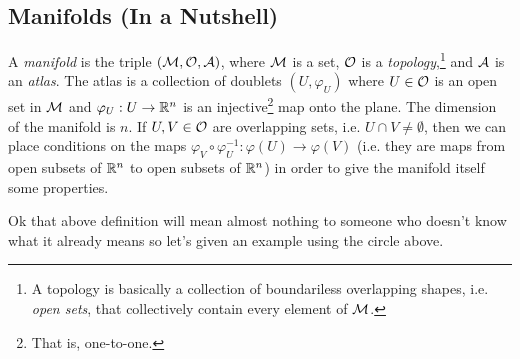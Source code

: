 \subsection{Manifolds (In a Nutshell)}

\bd[Manifold]
    A \textit{manifold} is the triple $(\mathcal{M},\mathcal{O},\mathcal{A})$, where $\mathcal{M}$ is a set, $\mathcal{O}$ is a \textit{topology},\footnote{A topology is basically a collection of boundariless overlapping shapes, i.e. \textit{open sets}, that collectively contain every element of $\mathcal{M}$.} and $\mathcal{A}$ is an \textit{atlas}. The atlas is a collection of doublets $(U,\varphi_U)$ where $U\in \mathcal{O}$ is an open set in $\mathcal{M}$ and $\varphi_U:U \to \mathbb{R}^n$ is an injective\footnote{That is, one-to-one.} map onto the plane. The dimension of the manifold is $n$. If $U,V\in\mathcal{O}$ are overlapping sets, i.e. $U\cap V \neq \emptyset$, then we can place conditions on the maps $\varphi_V\circ \varphi_U^{-1} : \varphi(U) \to \varphi(V)$ (i.e. they are maps from open subsets of $\mathbb{R}^n$ to open subsets of $\mathbb{R}^n$) in order to give the manifold itself some properties.
\ed 

Ok that above definition will mean almost nothing to someone who doesn't know what it already means so let's given an example using the circle above. 

